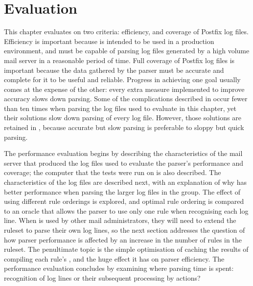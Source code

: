 \chapter{Evaluation}

\label{Evaluation}

\renewcommand{\figurename}{Graph}

\addtolength{\tabcolsep}{-2pt}

This chapter evaluates \parsername{} on two criteria: efficiency, and
coverage of  Postfix log files.  Efficiency is important because
\parsername{} is intended to be used in a production environment, and must
be capable of parsing log files generated by a high volume mail server in a
reasonable period of time.  Full coverage of Postfix log files is important
because the data gathered by the parser must be accurate and complete for
it to be useful and reliable.  Progress in achieving one goal usually comes
at the expense of the other: every extra measure implemented to improve
accuracy slows down parsing.  Some of the complications described in
 occur fewer than ten times when parsing the
\numberOFlogFILES{} log files used to evaluate \parsername{} in this
chapter, yet their solutions slow down parsing of every log file.  However,
those solutions are retained in \parsername{}, because accurate but slow
parsing is preferable to sloppy but quick parsing.

The performance evaluation begins by describing the characteristics of the
mail server that produced the \numberOFlogFILES{} log files used to
evaluate the parser's performance and coverage; the computer that the tests
were run on is also described.  The characteristics of the
\numberOFlogFILES{} log files are described next, with an explanation of
why \parsername{} has better performance when parsing the larger log files
in the group.  The effect of using different rule orderings is explored,
and optimal rule ordering is compared to an oracle that allows the parser
to use only one rule when recognising each log line.  When \parsername{} is
used by other mail administrators, they will need to extend the ruleset to
parse their own log lines, so the next section addresses the question of
how parser performance is affected by an increase in the number of rules in
the ruleset.  The penultimate topic is the simple optimisation of caching
the results of compiling each rule's , and the huge effect
it has on parser efficiency.  The performance evaluation concludes by
examining where parsing time is spent: recognition of log lines or their
subsequent processing by actions?

